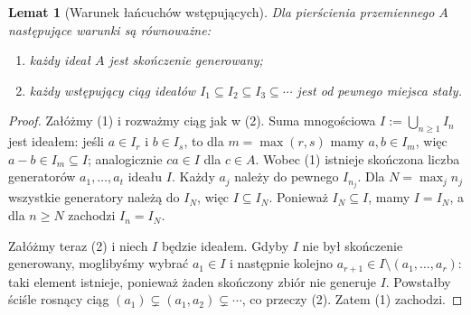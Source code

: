 \documentclass[11pt,a4paper,openany]{report}
\numberwithin{equation}{section}
\theoremstyle{plain}
\newtheorem{lemat}[twierdzenie]{Lemat}
\theoremstyle{definition}
\theoremstyle{remark}
\begin{document}
\begin{lemat}[Warunek łańcuchów wstępujących]
\label{lem:acc}
Dla pierścienia przemiennego $A$ następujące warunki są równoważne:
\begin{enumerate}[label=\arabic*)]
\item każdy ideał $A$ jest skończenie generowany;
\item każdy wstępujący ciąg ideałów
$I_1\subseteq I_2\subseteq I_3\subseteq\cdots$
jest od pewnego miejsca stały.
\end{enumerate}
\end{lemat}
\begin{proof}
Załóżmy (1) i rozważmy ciąg jak w (2).
Suma mnogościowa $I:=\bigcup_{n\ge1}I_n$ jest ideałem:
jeśli $a\in I_r$ i $b\in I_s$, to dla $m=\max(r,s)$
mamy $a,b\in I_m$, więc $a-b\in I_m\subseteq I$;
analogicznie $ca\in I$ dla $c\in A$.
Wobec (1) istnieje skończona liczba generatorów
$a_1,\dots,a_t$ ideału $I$. Każdy $a_j$ należy do pewnego
$I_{n_j}$. Dla $N=\max_j n_j$ wszystkie generatory należą
do $I_N$, więc $I\subseteq I_N$. Ponieważ $I_N\subseteq I$,
mamy $I=I_N$, a dla $n\ge N$ zachodzi $I_n=I_N$.

Załóżmy teraz (2) i niech $I$ będzie ideałem.
Gdyby $I$ nie był skończenie generowany, moglibyśmy wybrać
$a_1\in I$ i następnie kolejno $a_{r+1}\in I\setminus(a_1,\dots,a_r)$: taki element istnieje, ponieważ żaden
skończony zbiór nie generuje $I$.
Powstałby ściśle rosnący ciąg
$(a_1)\subsetneq(a_1,a_2)\subsetneq\cdots$,
co przeczy (2). Zatem (1) zachodzi.
\end{proof}
\end{document}
